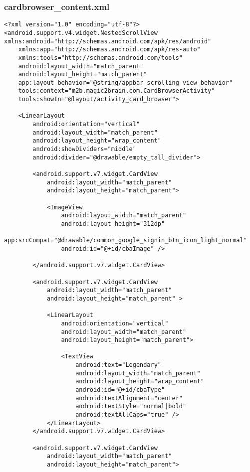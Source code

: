 \subsubsection*{cardbrowser\_content.xml}
\begin{lstlisting}
<?xml version="1.0" encoding="utf-8"?>
<android.support.v4.widget.NestedScrollView xmlns:android="http://schemas.android.com/apk/res/android"
    xmlns:app="http://schemas.android.com/apk/res-auto"
    xmlns:tools="http://schemas.android.com/tools"
    android:layout_width="match_parent"
    android:layout_height="match_parent"
    app:layout_behavior="@string/appbar_scrolling_view_behavior"
    tools:context="m2b.magic2brain.com.CardBrowserActivity"
    tools:showIn="@layout/activity_card_browser">

    <LinearLayout
        android:orientation="vertical"
        android:layout_width="match_parent"
        android:layout_height="wrap_content"
        android:showDividers="middle"
        android:divider="@drawable/empty_tall_divider">

        <android.support.v7.widget.CardView
            android:layout_width="match_parent"
            android:layout_height="match_parent">

            <ImageView
                android:layout_width="match_parent"
                android:layout_height="312dp"
                app:srcCompat="@drawable/common_google_signin_btn_icon_light_normal"
                android:id="@+id/cbaImage" />

        </android.support.v7.widget.CardView>

        <android.support.v7.widget.CardView
            android:layout_width="match_parent"
            android:layout_height="match_parent" >

            <LinearLayout
                android:orientation="vertical"
                android:layout_width="match_parent"
                android:layout_height="match_parent">

                <TextView
                    android:text="Legendary"
                    android:layout_width="match_parent"
                    android:layout_height="wrap_content"
                    android:id="@+id/cbaType"
                    android:textAlignment="center"
                    android:textStyle="normal|bold"
                    android:textAllCaps="true" />
            </LinearLayout>
        </android.support.v7.widget.CardView>

        <android.support.v7.widget.CardView
            android:layout_width="match_parent"
            android:layout_height="match_parent">


\end{lstlisting}
